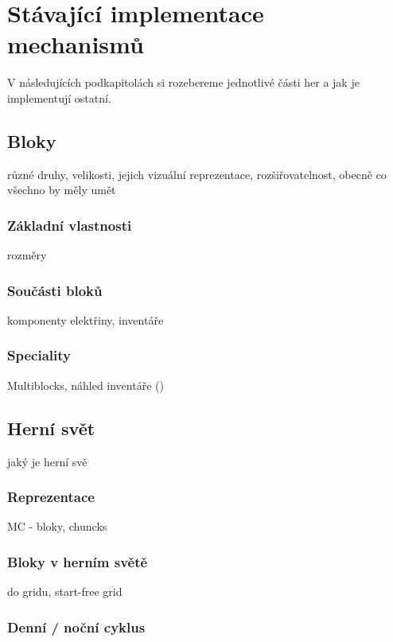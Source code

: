 

\section{Stávající implementace mechanismů}

V následujících podkapitolách si rozebereme jednotlivé části her a jak je implementují ostatní.

\subsection{Bloky}

různé druhy, velikosti, jejich vizuální reprezentace, rozšiřovatelnost, obecně co všechno by měly umět

\subsubsection{Základní vlastnosti}
rozměry

\subsubsection{Součásti bloků}
komponenty elektřiny, inventáře

\subsubsection{Speciality}
Multiblocks, náhled inventáře (\ME{})

\subsection{Herní svět}

jaký je herní svě

\subsubsection{Reprezentace}

MC - bloky, chuncks

\subsubsection{Bloky v herním světě}

do gridu, start-free grid

\subsubsection{Denní / noční cyklus}

